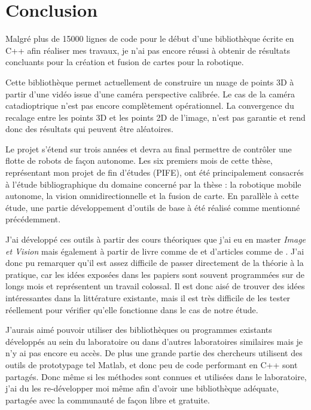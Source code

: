 \section{Conclusion}

Malgré plus de 15000 lignes de code pour le début d'une bibliothèque écrite en C++ afin réaliser mes travaux, je n'ai pas encore réussi à obtenir de résultats concluants pour la création et fusion de cartes pour la robotique.

Cette bibliothèque permet actuellement de construire un nuage de points 3D à partir d'une vidéo issue d'une caméra perspective calibrée.
Le cas de la caméra catadioptrique n'est pas encore complètement opérationnel.
La convergence du recalage entre les points 3D et les points 2D de l'image, n'est pas garantie et rend donc des résultats qui peuvent être aléatoires.

Le projet s'étend sur trois années et devra au final permettre de contrôler une flotte de robots de façon autonome.
Les six premiers mois de cette thèse, représentant mon projet de fin d'études (PIFE), ont été principalement consacrés à l'étude bibliographique du domaine concerné par la thèse : la robotique mobile autonome, la vision omnidirectionnelle et la fusion de carte.
En parallèle à cette étude, une partie développement d'outils de base à été réalisé comme mentionné précédemment.

J'ai développé ces outils à partir des cours théoriques que j'ai eu en master \emph{Image et Vision} mais également à partir de livre comme 
 de \citeauthor{Hartley03Book} \cite{Hartley03Book} 
et d'articles comme  de \citeauthor{Puig08} \cite{Puig08}.
J'ai donc pu remarquer qu'il est assez difficile de passer directement de la théorie à la pratique, car les idées exposées dans les papiers sont souvent programmées sur de longs mois et représentent un travail colossal.
Il est donc aisé de trouver des idées intéressantes dans la littérature existante, mais il est très difficile de les tester réellement pour vérifier qu'elle fonctionne dans le cas de notre étude.

J'aurais aimé pouvoir utiliser des bibliothèques ou programmes existants développés au sein du laboratoire ou dans d'autres laboratoires similaires mais je n'y ai pas encore eu accès.
De plus une grande partie des chercheurs utilisent des outils de prototypage tel Matlab, et donc peu de code performant en C++ sont partagés.
Donc même si les méthodes sont connues et utilisées dans le laboratoire, j'ai du les re-développer moi même afin d'avoir une bibliothèque adéquate, partagée avec la communauté de façon libre et gratuite.

